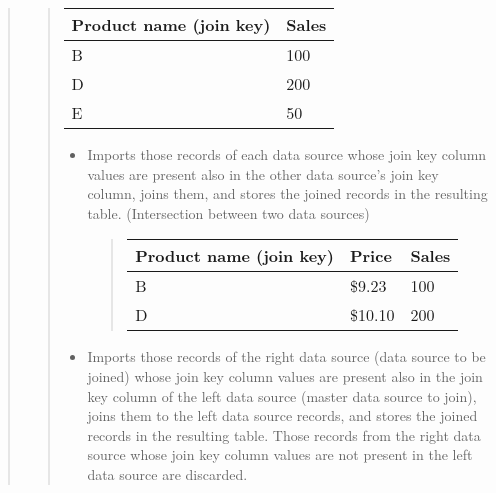 \documentclass[letterpaper,10pt,english]{sphinxmanual}
\begin{document}
\begin{enumerate}
\begin{quote}
\begin{itemize}
\begin{quote}
\begin{savenotes}\sphinxattablestart
\centering
{}
\sphinxthecaptionisattop
{}\label{\detokenize{discovery/part04/create_a_dashboard:data-source-to-be-joined}}
\sphinxaftertopcaption
\begin{tabulary}{\linewidth}[t]{|T|T|}
\hline
\sphinxstyletheadfamily 
Product name (join key)
&\sphinxstyletheadfamily 
Sales
\\
\hline
B
&
100
\\
\hline
D
&
200
\\
\hline
E
&
50
\\
\hline
\end{tabulary}
\par
\sphinxattableend\end{savenotes}
\begin{itemize}
\item {} 
 Imports those records of each data source whose join key column values are present also in the other data source’s join key column, joins them, and stores the joined records in the resulting table. (Intersection between two data sources)
\begin{quote}


\begin{savenotes}\sphinxattablestart
\centering
\begin{tabulary}{\linewidth}[t]{|T|T|T|}
\hline
\sphinxstyletheadfamily 
Product name (join key)
&\sphinxstyletheadfamily 
Price
&\sphinxstyletheadfamily 
Sales
\\
\hline
B
&
\$9.23
&
100
\\
\hline
D
&
\$10.10
&
200
\\
\hline
\end{tabulary}
\par
\sphinxattableend\end{savenotes}
\end{quote}

\item {} 
 Imports those records of the right data source (data source to be joined) whose join key column values are present also in the join key column of the left data source (master data source to join), joins them to the left data source records, and stores the joined records in the resulting table. Those records from the right data source whose join key column values are not present in the left data source are discarded.
\begin{quote}



\end{quote}
\end{itemize}
\end{quote}
\end{itemize}
\end{quote}
\end{enumerate}
\end{document}
